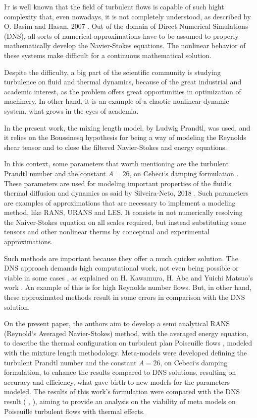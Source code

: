 \documentclass[10pt]{article} %
\begin{document}
\lettrine[nindent=0em,lines=2]{I}t is well known that the field of turbulent flows is capable of such hight complexity that, even nowadays, it is not completely understood, as described by O. Basim and Hasan, 2007 \cite{hasan}. Out of the domain of Direct Numerical Simulations (DNS), all sorts of numerical approximations have to be assumed to properly mathematically develop the Navier-Stokes equations. The nonlinear behavior of these systems \cite{John} make difficult for a continuous mathematical solution. 

Despite the difficulty, a big part of the scientific community is studying turbulence on fluid and thermal dynamics, because of the great industrial and academic interest, as the problem offers great opportunities in optimization of machinery. In other hand, it is an example of a chaotic nonlinear dynamic system, what grows in the eyes of academia.   

In the present work, the mixing length model, by Ludwig Prandtl, was used, and it relies on the Boussinesq hypothesis for being a way of modeling the Reynolds shear tensor and to close the filtered Navier-Stokes and energy equations.

In this context, some parameters that worth mentioning are the turbulent Prandtl number \cite{Prandtl} and the constant $A = 26$, on Cebeci`s damping formulation \cite{Cebeci}. These parameters are used for modeling important properties of the fluid`s thermal diffusion and dynamics as said by Silveira-Neto, 2018 \cite{aristeu}. Such parameters are examples of approximations that are necessary to implement a modeling method, like RANS, URANS and LES. It consists in not numerically resolving the Naiver-Stokes equation on all scales required, but instead substituting some tensors and other nonlinear therms by conceptual and experimental approximations.

Such methods are important because they offer a much quicker solution. The DNS approach demands high computational work, not even being possible or viable in some cases \cite{Kawamura}, as explained on H. Kawamura, H. Abe and Yuichi Matsuo's work \cite{Abe}. An example of this is for high Reynolds number flows. But, in other hand, these approximated methods result in some errors in comparison with the DNS solution.    

On the present paper, the authors aim to develop a semi analytical RANS (Reynold`s Averaged Navier-Stokes) method, with the averaged energy equation, to describe the thermal configuration on turbulent plan Poiseuille flows \cite{Poiseuille}, modeled with the mixture length methodology. Meta-models were developed defining the turbulent Prandtl number and the constant $A = 26$, on Cebeci`s damping formulation, to enhance the results compared to DNS solutions, resulting on accuracy and efficiency, what gave birth to new models for the parameters modeled. The results of this work's formulation were compared with the DNS result (\cite{DNS1020} , \cite{DNS150}), aiming to provide an analysis on the viability of meta models on Poiseuille turbulent flows with thermal effects. \\       
 
\end{document}
